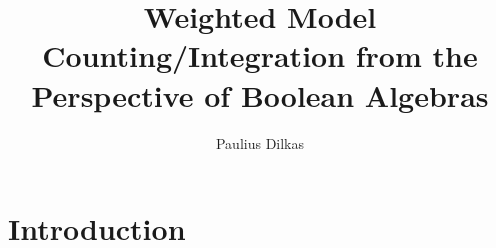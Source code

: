 \documentclass{article}
\title{Weighted Model Counting/Integration from the Perspective of Boolean Algebras}
\author{Paulius Dilkas}
\theoremstyle{definition}
\theoremstyle{remark}
\begin{document}
\maketitle

\section{Introduction}

\end{document}
